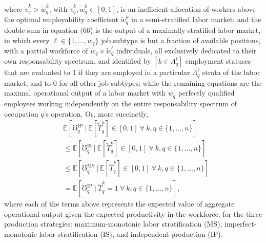\documentclass[hidelinks, nonatbib]{elsarticle}
\begin{document}
\begin{enumerate}
\begin{enumerate}
\begin{enumerate}
            where $\tilde{v}_{q}^{k} > \tilde{w}_{q}^{k}$, with $\tilde{v}_{q}^{k}, \tilde{w}_{q}^{k} \in [0,1]$, is an inefficient allocation of workers above the optimal employability coefficient $\tilde{w}_{q}^{k}$ in a semi-stratified labor market; and the double sum in equation (66) is the output of a maximally stratified labor market, in which every $\ell \in \{1, \dots, w_q\}$ job subtype is but a fraction of available positions, with a partial workforce of $w_q \times \tilde{w}_{q}^{\ell}$ individuals, all exclusively dedicated to their own responsability spectrum, and identified by $[k \in \Lambda_{q}^{\ell}]$ employment statuses that are evaluated to 1 if they are employed in a particular $\Lambda_{q}^{\ell}$ strata of the labor market, and to 0 for all other job subtypes; while the remaining equations are the maximal operational output of a labor market with $w_q$ perfectly qualified employees working independently on the entire responsability spectrum of occupation $q$'s operation. Or, more succinctly,
            \begin{align}
                &\mathbb{E}[
                    \mho_{q}^{\text{IP}}
                    \
                    |
                    \
                    \mathbb{E}[
                        \tilde{T}_{q}^{k}
                    ]
                    \in [0,1]
                    \
                    \forall
                    \
                    k,q \in \{1, \dots, n\}
                ]
                \\
                &\leq
                \mathbb{E}[
                    \mho_{q}^{\text{IS}}
                    \
                    |
                    \
                    \mathbb{E}[
                        \tilde{T}_{q}^{k}
                    ]
                    \in [0,1]
                    \
                    \forall
                    \
                    k,q \in \{1, \dots, n\}
                ]
                \\
                &\leq
                \mathbb{E}[
                    \mho_{q}^{\text{MS}}
                    \
                    |
                    \
                    \mathbb{E}[
                        \tilde{T}_{q}^{k}
                    ]
                    \in [0,1]
                    \
                    \forall
                    \
                    k,q \in \{1, \dots, n\}
                ]
                \\
                &=
                \mathbb{E}[
                    \mho_{q}^{\text{IP}}
                    \
                    |
                    \
                    \tilde{T}_{q}^{k}
                    = 1
                    \
                    \forall
                    \
                    k,q \in \{1, \dots, n\}
                ]
                ,
            \end{align}
            where each of the terms above represents the expected value of aggregate operational output given the expected productivity in the workforce, for the three production strategies: maximum-monotonic labor stratification (MS), imperfect-monotonic labor stratification (IS), and independent production (IP).


\end{enumerate}
\end{enumerate}
\end{enumerate}
\end{document}
